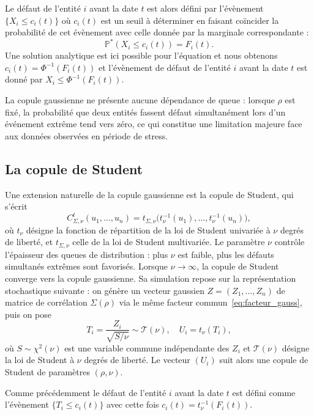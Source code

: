 Le défaut de l'entité $i$ avant la date $t$ est alors défini par l'évènement $\{X_i \leq c_i(t)\}$ où $c_i(t)$
est un seuil à déterminer en faisant coïncider la probabilité de cet évènement avec celle donnée par la marginale
correspondante :
\begin{equation}
    \mathbb{P}^\ast (X_i \leq c_i(t)) = F_i(t) .
\end{equation}
Une solution analytique est ici possible pour l'équation et nous obtenons $c_i(t) = \Phi^{-1}(F_i(t))$ et l'évènement
de défaut de l'entité $i$ avant la date $t$ est donné par $X_i \leq \Phi^{-1}(F_i(t))$.

La copule gaussienne ne présente aucune dépendance de queue : lorsque $\rho$ est fixé,
la probabilité que deux entités fassent défaut simultanément lors d'un événement extrême tend
vers zéro, ce qui constitue une limitation majeure face aux données observées en période de stress.

\subsection{La copule de Student}

Une extension naturelle de la copule gaussienne est la copule de Student, qui s'écrit
\begin{equation}
    C^t_{\Sigma,\nu}(u_1, \ldots, u_n) = t_{\Sigma,\nu}\bigl(t_\nu^{-1}(u_1), \ldots, t_\nu^{-1}(u_n)\bigr),
\end{equation}
où $t_\nu$ désigne la fonction de répartition de la loi de Student univariée à $\nu$ degrés de
liberté, et $t_{\Sigma,\nu}$ celle de la loi de Student multivariée. Le paramètre $\nu$ contrôle
l'épaisseur des queues de distribution : plus $\nu$ est faible, plus les défauts simultanés
extrêmes sont favorisés. Lorsque $\nu \to \infty$, la copule de Student converge vers la copule
gaussienne. Sa simulation repose sur la représentation stochastique suivante : on génère un
vecteur gaussien $Z = (Z_1, \ldots, Z_n)$ de matrice de corrélation $\Sigma(\rho)$ via le même
facteur commun~\eqref{eq:facteur_gauss}, puis on pose
\begin{equation}
    T_i = \frac{Z_i}{\sqrt{S/\nu}} \sim \mathcal{T}(\nu), \quad U_i = t_\nu(T_i),
\end{equation}
où $S \sim \chi^2(\nu)$ est une variable commune indépendante des $Z_i$ et $\mathcal{T}(\nu)$ désigne la
loi de Student à $\nu$ degrés de liberté. Le vecteur $(U_i)$ suit
alors une copule de Student de paramètres $(\rho, \nu)$.

Comme précédemment le défaut de l'entité $i$ avant la date $t$ est défini comme l'évènement $\{T_i \leq c_i(t) \}$
avec cette fois $c_i(t) = t_\nu^{-1}(F_i(t))$.


